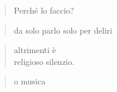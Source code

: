 
\begin{verse}
    Perché lo faccio?    
\end{verse}
\vspace{-0.9cm}
\begin{verse}
    da solo parlo \hfill solo per deliri
\end{verse}
\vspace{-0.9cm}
\begin{verse}
    altrimenti è\\
    religioso silenzio.
\end{verse}
\begin{verse}
    \hfill o musica
\end{verse}